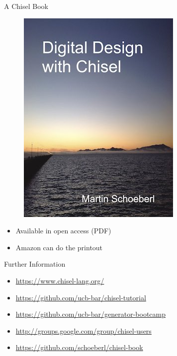 \documentclass[xcolor=pdflatex,dvipsnames,table]{beamer}
\begin{document}
\begin{frame}[fragile]{A Chisel Book}
\begin{figure}
    \centering
    \href{https://github.com/schoeberl/chisel-book}{\includegraphics[scale=0.4]{../cover-small}}
\end{figure}

\begin{itemize}
\item Available in open access (PDF)
\item Amazon can do the printout
\end{itemize}
\end{frame}

\begin{frame}[fragile]{Further Information}
\begin{itemize}
\item \url{https://www.chisel-lang.org/}
\item \url{https://github.com/ucb-bar/chisel-tutorial}
\item \url{https://github.com/ucb-bar/generator-bootcamp}
\item \url{http://groups.google.com/group/chisel-users}
\item \url{https://github.com/schoeberl/chisel-book}
\end{itemize}
\end{frame}
\end{document}
